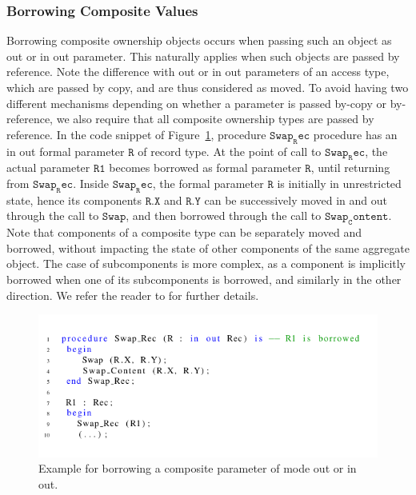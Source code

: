 \documentclass{llncs}
\newcommand\var[1]{\ensuremath{\mathtt{#1}}}
\newcommand{\keyword}[1]{\textsf{#1}}
\begin{document}
\subsubsection{Borrowing Composite Values}
\label{subsubsec:borrowComposite}

Borrowing composite ownership objects occurs when passing such an object as \keyword{out} or \keyword{in out} parameter. This naturally applies when
such objects are passed by reference. Note the difference with \keyword{out} or \keyword{in out} parameters of an access type, which are passed by copy,
and are thus considered as moved. To avoid having two different mechanisms depending on whether a parameter is passed by-copy or by-reference, we also require
that all composite ownership types are passed by reference.
In the code snippet of Figure~\ref{fig:borrowingComposite}, procedure \var{Swap_Rec} procedure has an \keyword{in out} formal parameter \var{R} of record type. At the point of
call to \var{Swap_Rec}, the actual parameter \var{R1} becomes borrowed as formal parameter \var{R}, until returning from \var{Swap_Rec}. Inside \var{Swap_Rec}, the formal parameter \var{R} is initially
in unrestricted state, hence its components \var{R.X} and \var{R.Y} can be successively moved in and out through the call to \var{Swap}, and then borrowed through the call to \var{Swap_Content}.
Note that components of a composite type can be separately moved and borrowed, without impacting the state of other components of the same aggregate object.
The case of subcomponents is more complex, as a component is implicitly borrowed when one of its subcomponents is borrowed, and similarly in the other direction.
We refer the reader to \cite{AI2017} for further details.

\begin{figure}[htb!]
\centering
   \includegraphics[width=0.9\columnwidth]{borrowingComposite}
   \caption{Example for borrowing a composite parameter of mode \keyword{out} or \keyword{in out}.}
   \label{fig:borrowingComposite}
\end{figure}
\end{document}
